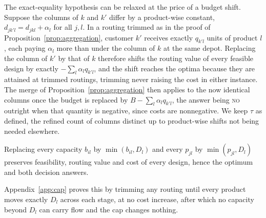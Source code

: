 \begin{remark}\label{rem:addshift}
The exact-equality hypothesis can be relaxed at the price of a budget
shift. Suppose the columns of $k$ and $k'$ differ by a product-wise
constant, $d_{jk'l}=d_{jkl}+\alpha_l$ for all $j,l$. In a routing
trimmed as in the proof of Proposition~\ref{prop:aggregation},
customer $k'$ receives exactly $q_{k'l}$ units of product $l$, each
paying $\alpha_l$ more than under the column of $k$ at the same
depot. Replacing the column of $k'$ by that of $k$ therefore shifts
the
routing value of every feasible design by exactly
$-\sum_l\alpha_l q_{k'l}$, and the shift reaches the optima because
they are attained at trimmed routings, trimming never raising the
cost in either instance. The merge of
Proposition~\ref{prop:aggregation} then applies to the now identical
columns once the budget is replaced by
$B-\sum_l\alpha_l q_{k'l}$, the answer being \textsc{no} outright
when that quantity is negative, since costs are nonnegative. We keep
$\tau$ as defined, the refined count of columns distinct up to
product-wise shifts not being needed elsewhere.
\end{remark}

\begin{observation}\label{obs:capping}
Replacing every capacity $b_{il}$ by $\min(b_{il},D_l)$ and every
$p_{jl}$ by $\min(p_{jl},D_l)$ preserves feasibility, routing value and
cost of every design, hence the optimum and both decision answers.
\end{observation}
Appendix~\ref{app:cap} proves this by trimming any routing until every
product moves exactly $D_l$ across each stage, at no cost increase,
after which no capacity beyond $D_l$ can carry flow and the cap changes
nothing.

